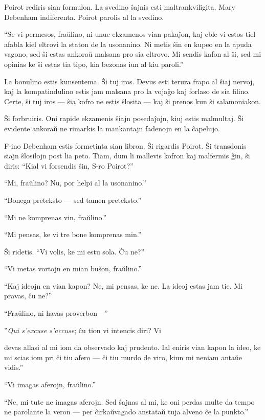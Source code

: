 Poirot rediris sian formulon. La svedino ŝajnis esti maltrankviligita, Mary Debenham indiferenta. Poirot parolis al la svedino.

``Se vi permesos, fraŭlino, ni unue ekzamenos vian pakaĵon, kaj eble vi estos tiel afabla kiel eltrovi la staton de la usonanino. Ni metis ŝin en kupeo en la apuda vagono, sed ŝi estas ankoraŭ malsana pro sia eltrovo. Mi sendis kafon al ŝi, sed mi opinias ke ŝi estas tia tipo, kia bezonas iun al kiu paroli.''

La bonulino estis kunsentema. Ŝi tuj iros. Devus esti terura frapo al ŝiaj nervoj, kaj la kompatindulino estis jam malsana pro la vojaĝo kaj forlaso de sia filino. Certe, ŝi tuj iros --- ŝia kofro ne estis ŝlosita --- kaj ŝi prenos kun ŝi salamoniakon.

Ŝi forbruiris. Oni rapide ekzamenis ŝiajn posedaĵojn, kiuj estis malmultaj. Ŝi evidente ankoraŭ ne rimarkis la mankantajn fadenojn en la ĉapelujo.

F-ino Debenham estis formetinta sian libron. Ŝi rigardis Poirot. Ŝi transdonis siajn ŝlosilojn post lia peto. Tiam, dum li mallevis kofron kaj malfermis ĝin, ŝi diris: ``Kial vi forsendis ŝin, S-ro Poirot?''

``Mi, fraŭlino? Nu, por helpi al la usonanino.''

``Bonega preteksto --- sed tamen preteksto.''

``Mi ne komprenas vin, fraŭlino.''

``Mi pensas, ke vi tre bone komprenas min.''

Ŝi ridetis. ``Vi volis, ke mi estu sola. Ĉu ne?''

``Vi metas vortojn en mian buŝon, fraŭlino.''

``Kaj ideojn en vian kapon? Ne, mi pensas, ke ne. La ideoj estas jam tie. Mi pravas, ĉu ne?''

``Fraŭlino, ni havas proverbon---''

''\emph{Qui s'excuse s'accuse}; ĉu tion vi intencis diri? Vi

devas allasi al mi iom da observado kaj prudento. Ial eniris vian kapon la ideo, ke mi scias iom pri ĉi tiu afero --- ĉi tiu murdo de viro, kiun mi neniam antaŭe vidis.''

``Vi imagas aferojn, fraŭlino.''

``Ne, mi tute ne imagas aferojn. Sed ŝajnas al mi, ke oni perdas multe da tempo ne parolante la veron --- per ĉirkaŭvagado anstataŭ tuja alveno ĉe la punkto.''

